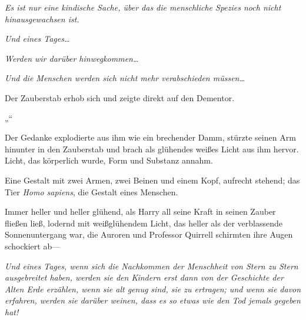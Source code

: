 \emph{Es ist nur eine kindische Sache, über das die menschliche Spezies noch nicht hinausgewachsen ist.}

\emph{Und eines Tages…}

\emph{Werden wir darüber hinwegkommen…}

\emph{Und die Menschen werden sich nicht mehr verabschieden müssen…}

Der Zauberstab erhob sich und zeigte direkt auf den Dementor.

„\emph{}“

Der Gedanke explodierte aus ihm wie ein brechender Damm, stürzte seinen Arm hinunter in den Zauberstab und brach als glühendes weißes Licht aus ihm hervor. Licht, das körperlich wurde, Form und Substanz annahm.

Eine Gestalt mit zwei Armen, zwei Beinen und einem Kopf, aufrecht stehend; das Tier \emph{Homo sapiens}, die Gestalt eines Menschen.

Immer heller und heller glühend, als Harry all seine Kraft in seinen Zauber fließen ließ, lodernd mit weißglühendem Licht, das heller als der verblassende Sonnenuntergang war, die Auroren und Professor Quirrell schirmten ihre Augen schockiert ab—

\emph{Und eines Tages, wenn sich die Nachkommen der Menschheit von Stern zu Stern ausgebreitet haben, werden sie den Kindern erst dann von der Geschichte der Alten Erde erzählen, wenn sie alt genug sind, sie zu ertragen; und wenn sie davon erfahren, werden sie darüber weinen, dass es so etwas wie den Tod jemals gegeben hat!}

